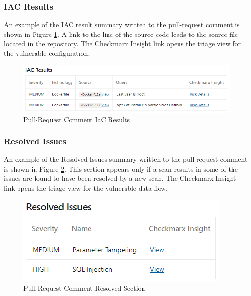 \subsubsection{IAC Results}

An example of the IAC result summary written to the pull-request comment
is shown in Figure
\ref{fig:pr-iac-section}. A
link to the line of the source code leads to the source file located in the
repository.  The Checkmarx Insight link opens the triage view for the vulnerable
configuration.

\begin{figure}[h]
    \includegraphics[width=\textwidth]{graphics/pr-iac.png}
    \caption{Pull-Request Comment IaC Results}
    \label{fig:pr-iac-section}
\end{figure}

\subsubsection{Resolved Issues}

An example of the Resolved Issues summary written to the pull-request comment
is shown in Figure
\ref{fig:pr-resolved-section}. This section appears only if a scan results in
some of the issues are found to have been resolved by a new scan.
The Checkmarx Insight link opens the triage view for the vulnerable
data flow.

\begin{figure}[h]
    \includegraphics[width=\textwidth]{graphics/pr-resolved.png}
    \caption{Pull-Request Comment Resolved Section}
    \label{fig:pr-resolved-section}
\end{figure}

